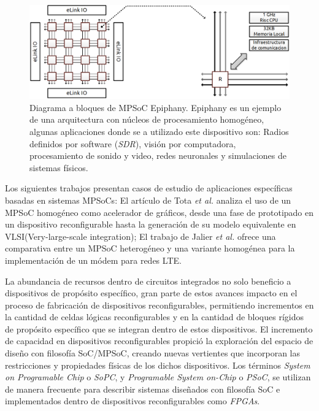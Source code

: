 \begin{figure}
	\begin{center}
		\includegraphics[scale=0.6]{figures/ch1_epiphany_soc.png}
	\end{center}
	\caption
		{	
			Diagrama a bloques de MPSoC Epiphany. Epiphany es un ejemplo de una arquitectura con núcleos de procesamiento homogéneo, algunas aplicaciones donde se a utilizado este dispositivo son: Radios definidos por software (\textit{SDR}), visión por computadora, procesamiento de sonido y video, redes neuronales y simulaciones de sistemas físicos.
		}
	\label{fig:ch1_epiphany_soc}
\end{figure}

Los siguientes trabajos presentan casos de estudio de aplicaciones específicas basadas en sistemas MPSoCs: El artículo de Tota \textit{et al.}\cite{chapter1:Tota:2009:CSN:1643330.1643337} analiza el uso de un MPSoC homogéneo como acelerador de gráficos, desde una fase de prototipado en un dispositivo reconfigurable hasta la generación de su modelo equivalente en VLSI(Very-large-scale integration); El trabajo de Jalier \textit{et al.}\cite{chapter1:Jalier:2010:HVH:1870926.1870971} ofrece una comparativa entre un MPSoC heterogéneo y una variante homogénea para la implementación de un módem para redes LTE.

La abundancia de recursos dentro de circuitos integrados no solo beneficio a dispositivos de propósito específico, gran parte de estos avances impacto en el proceso de fabricación de dispositivos reconfigurables, permitiendo incrementos en la cantidad de celdas lógicas reconfigurables y en la cantidad de bloques rígidos de propósito específico que se integran dentro de estos dispositivos. El incremento de capacidad en dispositivos reconfigurables propició la exploración del espacio de diseño con filosofía SoC/MPSoC, creando nuevas vertientes que incorporan las restricciones y propiedades físicas de los dichos dispositivos. Los términos \textit{System on Programable Chip} o \textit{SoPC}, y \textit{Programable System on-Chip} o \textit{PSoC}, se utilizan de manera frecuente para describir sistemas diseñados con filosofía SoC e implementados dentro de dispositivos reconfigurables como \textit{FPGAs}.

